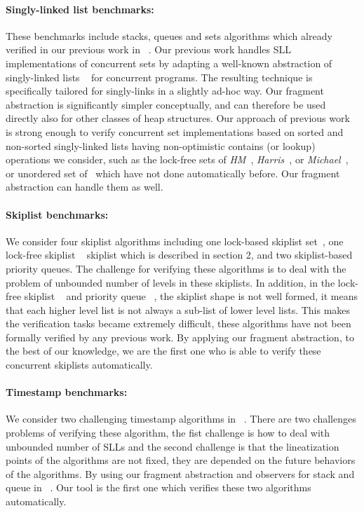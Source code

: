 \paragraph{Singly-linked list benchmarks:} These benchmarks include stacks, queues and sets algorithms which already verified in our previous work in ~\cite{Quy:sas16}. Our previous work handles SLL implementations of concurrent sets by adapting a well-known abstraction of singly-linked lists ~\cite{MYRS:Canonical} for concurrent programs.
The resulting technique is specifically tailored for singly-links in a slightly ad-hoc way.
Our fragment abstraction is significantly simpler conceptually, and can therefore be used directly
also for other classes of heap structures. Our approach of previous work is strong enough to verify  concurrent set
implementations based on sorted and non-sorted singly-linked lists having non-optimistic contains (or lookup) operations we consider, such as the lock-free sets of {\it HM}~\cite{ArtOfMpP}, {\it Harris}~\cite{Harris:list}, or {\it Michael}~\cite{Michael:list}, or unordered set of~\cite{Zhang:unorderedlist} which have not done automatically before. Our fragment abstraction can handle them as well.

\paragraph{Skiplist benchmarks:} We consider four skiplist algorithms including one lock-based skiplist set~\cite{MS:QueueAlgorithms}, one lock-free skiplist ~\cite{ArtOfMpP} skiplist which is described in section 2, and two skiplist-based priority queues. The challenge for verifying these algorithms is to deal with the problem of unbounded number of levels in these skiplists. In addition, in the lock-free skiplist ~\cite{ArtOfMpP} and priority queue ~\cite{Linden:opodis13}, the skiplist shape is not well formed, it means that each higher level list is not always a sub-list of lower level lists. This makes the verification tasks became extremely difficult, these algorithms have not been formally verified by any previous work. By applying our fragment abstraction,  to the best of our knowledge, we are the first one who is able to verify these concurrent skiplists automatically. 

\paragraph{Timestamp benchmarks:} We consider two challenging timestamp algorithms in ~\cite{ts-stack}. There are two challenges problems of verifying these algorithm, the fist challenge is how to deal with unbounded number of SLLs and the second challenge is that the lineatization points of the algorithms are not fixed, they are depended on the future behaviors of the algorithms. By using our fragment abstraction and observers for stack and queue in ~\cite{BEEH:icalp15}. Our tool is the first one which verifies these two algorithms automatically.

